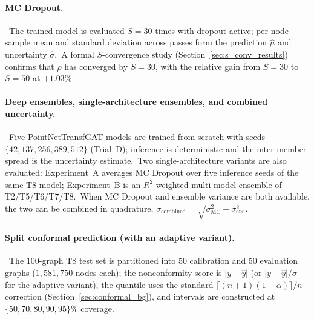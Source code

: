 \paragraph{MC Dropout.}\ The trained model is evaluated $S = 30$ times with dropout active; per-node sample mean and standard deviation across passes form the prediction $\hat\mu$ and uncertainty $\hat\sigma$.\ A formal $S$-convergence study (Section~\ref{sec:s_conv_results}) confirms that $\rho$ has converged by $S = 30$, with the relative gain from $S = 30$ to $S = 50$ at $+1.03\%$.

\paragraph{Deep ensembles, single-architecture ensembles, and combined uncertainty.}\ Five PointNetTransfGAT models are trained from scratch with seeds $\{42, 137, 256, 389, 512\}$ (Trial~D); inference is deterministic and the inter-member spread is the uncertainty estimate.\ Two single-architecture variants are also evaluated: Experiment~A averages MC Dropout over five inference seeds of the same T8 model; Experiment~B is an $R^2$-weighted multi-model ensemble of T2/T5/T6/T7/T8.\ When MC Dropout and ensemble variance are both available, the two can be combined in quadrature, $\sigma_\text{combined} = \sqrt{\sigma_\text{MC}^2 + \sigma_\text{ens}^2}$.

\paragraph{Split conformal prediction (with an adaptive variant).}\ The 100-graph T8 test set is partitioned into 50 calibration and 50 evaluation graphs ($1{,}581{,}750$ nodes each); the nonconformity score is $|y - \hat y|$ (or $|y - \hat y|/\sigma$ for the adaptive variant), the quantile uses the standard $\lceil(n+1)(1-\alpha)\rceil/n$ correction (Section~\ref{sec:conformal_bg}), and intervals are constructed at $\{50, 70, 80, 90, 95\}\%$ coverage.

